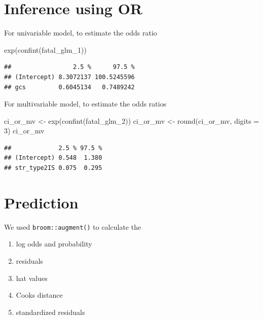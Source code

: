 \documentclass[
]{book}
\makeatletter
\newenvironment{Shaded}{\begin{snugshade}}{\end{snugshade}}
\newcommand{\AttributeTok}[1]{\textcolor[rgb]{0.61,0.61,0.61}{#1}}
\newcommand{\DecValTok}[1]{\textcolor[rgb]{0.06,0.06,0.06}{#1}}
\newcommand{\FunctionTok}[1]{\textcolor[rgb]{0,0,0}{#1}}
\newcommand{\NormalTok}[1]{#1}
\newcommand{\OtherTok}[1]{\textcolor[rgb]{0.37,0.37,0.37}{#1}}
\providecommand{\tightlist}{%
  \setlength{\itemsep}{0pt}\setlength{\parskip}{0pt}}
\newenvironment{kframe}{%
\medskip{}
\setlength{\fboxsep}{.8em}
 \def\at@end@of@kframe{}%
 \ifinner\ifhmode%
  \def\at@end@of@kframe{\end{minipage}}%
  \begin{minipage}{\columnwidth}%
 \fi\fi%
 \def\FrameCommand##1{\hskip\@totalleftmargin \hskip-\fboxsep
 \colorbox{shadecolor}{##1}\hskip-\fboxsep
     \hskip-\linewidth \hskip-\@totalleftmargin \hskip\columnwidth}%
 \MakeFramed {\advance\hsize-\width
   \@totalleftmargin\z@ \linewidth\hsize
   \@setminipage}}%
 {\par\unskip\endMakeFramed%
 \at@end@of@kframe}
\renewenvironment{Shaded}{\begin{kframe}}{\end{kframe}}
\makeatother
\begin{document}
\hypertarget{inference-using-or}{%
\section{Inference using OR}\label{inference-using-or}}

For univariable model, to estimate the odds ratio

\begin{Shaded}
\begin{Highlighting}[]
\FunctionTok{exp}\NormalTok{(}\FunctionTok{confint}\NormalTok{(fatal\_glm\_1))}
\end{Highlighting}
\end{Shaded}

\begin{verbatim}
##                 2.5 %      97.5 %
## (Intercept) 8.3072137 100.5245596
## gcs         0.6045134   0.7489242
\end{verbatim}

For multivariable model, to estimate the odds ratios

\begin{Shaded}
\begin{Highlighting}[]
\NormalTok{ci\_or\_mv }\OtherTok{\textless{}{-}} \FunctionTok{exp}\NormalTok{(}\FunctionTok{confint}\NormalTok{(fatal\_glm\_2))}
\NormalTok{ci\_or\_mv }\OtherTok{\textless{}{-}} \FunctionTok{round}\NormalTok{(ci\_or\_mv, }\AttributeTok{digits =} \DecValTok{3}\NormalTok{)}
\NormalTok{ci\_or\_mv}
\end{Highlighting}
\end{Shaded}

\begin{verbatim}
##             2.5 % 97.5 %
## (Intercept) 0.548  1.380
## str_type2IS 0.075  0.295
\end{verbatim}

\hypertarget{prediction-1}{%
\section{Prediction}\label{prediction-1}}

We used \texttt{broom::augment()} to calculate the

\begin{enumerate}
\def\labelenumi{\arabic{enumi}.}
\tightlist
\item
  log odds and probability
\item
  residuals
\item
  hat values
\item
  Cooks distance
\item
  standardized residuals
\end{enumerate}
\end{document}
